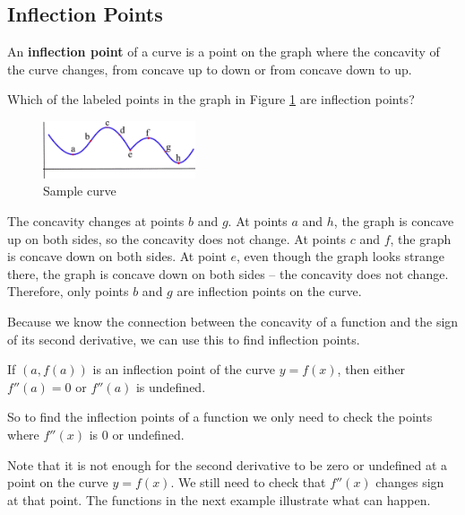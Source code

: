 \subsection{Inflection Points}

\begin{definition}
An {\bf inflection point} of a curve is a point on the graph where the concavity of the curve changes, from concave up to down or from concave down to up.
\end{definition}

\begin{example}
Which of the labeled points in the graph in Figure \ref{fig:3-3-curve} are inflection points?

\begin{figure}[!ht]
  \centering
    \includegraphics[width=0.4\textwidth]{img/chap3/image047.png}
    \caption{Sample curve}
    \label{fig:3-3-curve}
\end{figure}
\begin{solution} The concavity changes at points $b$ and $g$. At points $a$ and $h$, the graph is concave up on both sides, so the concavity does not change. At points $c$ and $f$, the graph is concave down on both sides. At point $e$, even though the graph looks strange there, the graph is concave down on both sides – the concavity does not change. Therefore, only points $b$ and $g$ are inflection points on the curve.
\end{solution}\end{example}

Because we know the connection between the concavity of a function and the sign of its second derivative, we can use this to find inflection points.

\begin{theorem}
If $(a, f(a))$ is an inflection point of the curve $y=f(x)$, then either $f''(a) = 0$ or $f''(a)$ is undefined. 
\end{theorem}
So to find the inflection points of a function we only need to check the points where $f''(x)$ is 0 or undefined.

Note that it is not enough for the second derivative to be zero or undefined at a point on the curve $y=f(x)$. We still need to check that $f''(x)$ changes sign at that point. The functions in the next example illustrate what can happen.

